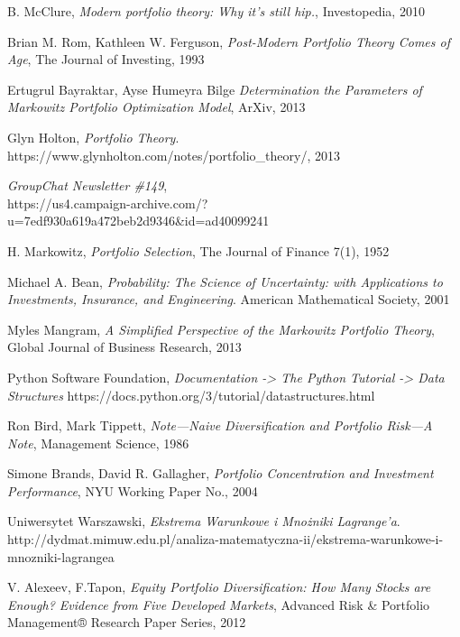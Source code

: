 \documentclass[magister]{dyplom}
\begin{document}
\begin{thebibliography}{30}
	B. McClure,
	\emph{Modern portfolio theory: Why it’s still hip.},
	Investopedia, 2010
	
	Brian M. Rom, Kathleen W. Ferguson,
	\emph{Post-Modern Portfolio Theory Comes of Age},
	The Journal of Investing, 1993

	Ertugrul Bayraktar, Ayse Humeyra Bilge
	\emph{Determination the Parameters of Markowitz Portfolio Optimization Model},
	ArXiv, 2013

	Glyn Holton,
	\emph{Portfolio Theory}.
	https://www.glynholton.com/notes/portfolio\_theory/,
	2013

	\emph{GroupChat Newsletter \#149},\\
	https://us4.campaign-archive.com/?u=7edf930a619a472beb2d9346\&id=ad40099241

	H. Markowitz,
	\emph{Portfolio Selection},
	The Journal of Finance 7(1), 1952
	
	Michael A. Bean,
	\emph{Probability: The Science of Uncertainty: with Applications to Investments, Insurance, and Engineering}.
	American Mathematical Society, 2001

	Myles Mangram,
	\emph{A Simplified Perspective of the Markowitz Portfolio Theory},
	Global Journal of Business Research, 2013
	
	Python Software Foundation,
	\emph{Documentation -> The Python Tutorial -> Data Structures}
	https://docs.python.org/3/tutorial/datastructures.html
		
	Ron Bird, Mark Tippett,
	\emph{Note---Naive Diversification and Portfolio Risk---A Note},
	Management Science, 1986

	Simone Brands, David R. Gallagher,
	\emph{Portfolio Concentration and Investment Performance},
	NYU Working Paper No., 2004

	Uniwersytet Warszawski,
	\emph{Ekstrema Warunkowe i Mnożniki Lagrange'a}.
	http://dydmat.mimuw.edu.pl/analiza-matematyczna-ii/ekstrema-warunkowe-i-mnozniki-lagrangea

	V. Alexeev, F.Tapon,
	\emph{Equity Portfolio Diversification: How Many Stocks are Enough? Evidence from Five Developed Markets},
	Advanced Risk \& Portfolio Management® Research Paper Series, 2012


\end{thebibliography}
\end{document}
